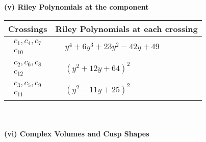 \documentclass[1p]{elsarticle_modified}
\theoremstyle{definition}
\begin{document}
\newpage\renewcommand{\arraystretch}{1}
\flushleft \textbf{(v) Riley Polynomials at the component}\newline \\
\begin{tabular}{m{50pt}|m{274pt}}
Crossings & \hspace{64pt}Riley Polynomials at each crossing \\
\hline $$\begin{aligned}c_{1},c_{4},c_{7}\\c_{10}\end{aligned}$$&$\begin{aligned}
&y^4+6 y^3+23 y^2-42 y+49
\end{aligned}$\\
\hline $$\begin{aligned}c_{2},c_{6},c_{8}\\c_{12}\end{aligned}$$&$\begin{aligned}
&(y^2+12 y+64)^2
\end{aligned}$\\
\hline $$\begin{aligned}c_{3},c_{5},c_{9}\\c_{11}\end{aligned}$$&$\begin{aligned}
&(y^2-11 y+25)^2
\end{aligned}$\\
\hline
\end{tabular}\\~\\
\newpage\flushleft \textbf{(vi) Complex Volumes and Cusp Shapes}
\end{document}
